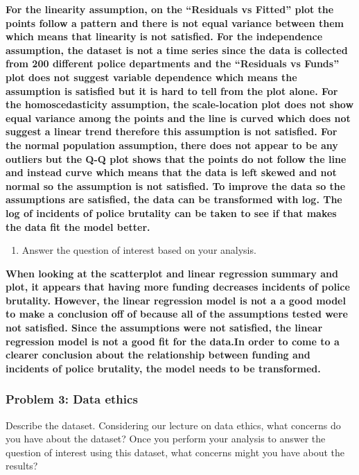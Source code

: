\documentclass[
]{article}
\providecommand{\tightlist}{%
  \setlength{\itemsep}{0pt}\setlength{\parskip}{0pt}}
\begin{document}
\textbf{For the linearity assumption, on the ``Residuals vs Fitted''
plot the points follow a pattern and there is not equal variance between
them which means that linearity is not satisfied. For the independence
assumption, the dataset is not a time series since the data is collected
from 200 different police departments and the ``Residuals vs Funds''
plot does not suggest variable dependence which means the assumption is
satisfied but it is hard to tell from the plot alone. For the
homoscedasticity assumption, the scale-location plot does not show equal
variance among the points and the line is curved which does not suggest
a linear trend therefore this assumption is not satisfied. For the
normal population assumption, there does not appear to be any outliers
but the Q-Q plot shows that the points do not follow the line and
instead curve which means that the data is left skewed and not normal so
the assumption is not satisfied. To improve the data so the assumptions
are satisfied, the data can be transformed with log. The log of
incidents of police brutality can be taken to see if that makes the data
fit the model better. }

\begin{enumerate}
\def\labelenumi{\alph{enumi}.}
\setcounter{enumi}{4}
\tightlist
\item
  Answer the question of interest based on your analysis.
\end{enumerate}

\textbf{When looking at the scatterplot and linear regression summary
and plot, it appears that having more funding decreases incidents of
police brutality. However, the linear regression model is not a a good
model to make a conclusion off of because all of the assumptions tested
were not satisfied. Since the assumptions were not satisfied, the linear
regression model is not a good fit for the data.In order to come to a
clearer conclusion about the relationship between funding and incidents
of police brutality, the model needs to be transformed. }

\hypertarget{problem-3-data-ethics}{%
\subsubsection{Problem 3: Data ethics}\label{problem-3-data-ethics}}

Describe the dataset. Considering our lecture on data ethics, what
concerns do you have about the dataset? Once you perform your analysis
to answer the question of interest using this dataset, what concerns
might you have about the results?
\end{document}
